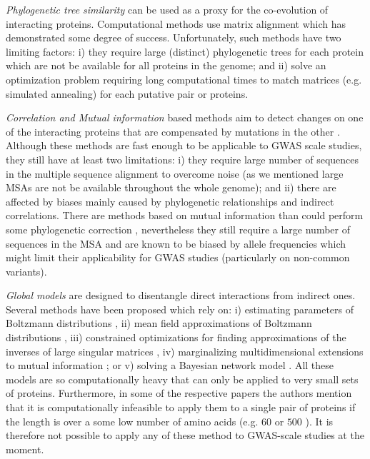 \textit{Phylogenetic tree similarity} can be used as a proxy for the co-evolution of interacting proteins. 
Computational methods use matrix alignment \cite{ramani2003exploiting} which has demonstrated some degree of success. 
Unfortunately, such methods have two limiting factors: 
i) they require large (distinct) phylogenetic trees for each protein which are not be available for all proteins in the genome; and 
ii) solve an optimization problem requiring long computational times to match matrices (e.g. simulated annealing) for each putative pair or proteins.

\textit{Correlation and Mutual information} based methods aim to detect changes on one of the interacting proteins that are compensated by mutations in the other \cite{pazos1997correlated,gobel1994correlated}. 
Although these methods are fast enough to be applicable to GWAS scale studies, they still have at least two limitations: 
i) they require large number of sequences in the multiple sequence alignment to overcome noise (as we mentioned large MSAs are not be available throughout the whole genome); and 
ii) there are affected by biases mainly caused by phylogenetic relationships and indirect correlations. 
There are methods based on mutual information than could perform some phylogenetic correction \cite{de2013emerging}, nevertheless they still require a large number of sequences in the MSA and are known to be biased by allele frequencies \cite{dunn2008mutual} which might limit their applicability for GWAS studies (particularly on non-common variants).
    
\textit{Global models} are designed to disentangle direct interactions from indirect ones. 
Several methods have been proposed which rely on: 
i) estimating parameters of Boltzmann distributions \cite{lapedes2012using,weigt2009identification}, 
ii) mean field approximations of Boltzmann distributions \cite{morcos2011direct}, 
iii) constrained optimizations for finding approximations of the inverses of large singular matrices \cite{jones2012psicov}, 
iv) marginalizing multidimensional extensions to mutual information \cite{clark2014multidimensional}; or 
v) solving a Bayesian network model \cite{burger2010disentangling}. 
All these models are so computationally heavy that can only be applied to very small sets of proteins. 
Furthermore, in some of the respective papers the authors mention that it is computationally infeasible to apply them to a single pair of proteins if the length is over a some low number of amino acids (e.g. $60$ \cite{weigt2009identification} or $500$ \cite{morcos2011direct}). 
It is therefore not possible to apply any of these method to GWAS-scale studies at the moment.

